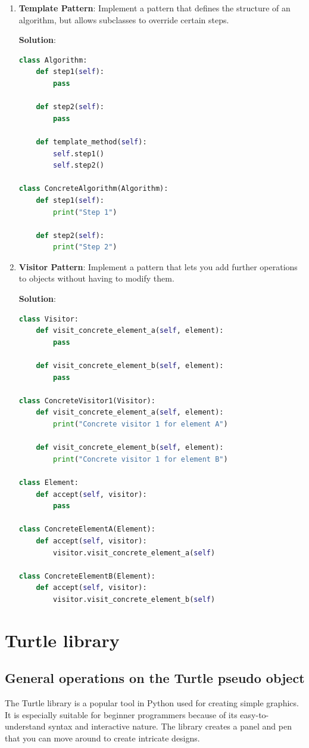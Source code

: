 \documentclass[12pt]{book}
\begin{document}
\begin{enumerate}
    \item \textbf{Template Pattern}: Implement a pattern that defines the structure of an algorithm, but allows subclasses to override certain steps.

    \textbf{Solution}:
    \begin{lstlisting}[language=Python]
class Algorithm:
    def step1(self):
        pass

    def step2(self):
        pass

    def template_method(self):
        self.step1()
        self.step2()

class ConcreteAlgorithm(Algorithm):
    def step1(self):
        print("Step 1")

    def step2(self):
        print("Step 2")
    \end{lstlisting}

    \item \textbf{Visitor Pattern}: Implement a pattern that lets you add further operations to objects without having to modify them.

    \textbf{Solution}:
    \begin{lstlisting}[language=Python]
class Visitor:
    def visit_concrete_element_a(self, element):
        pass

    def visit_concrete_element_b(self, element):
        pass

class ConcreteVisitor1(Visitor):
    def visit_concrete_element_a(self, element):
        print("Concrete visitor 1 for element A")

    def visit_concrete_element_b(self, element):
        print("Concrete visitor 1 for element B")

class Element:
    def accept(self, visitor):
        pass

class ConcreteElementA(Element):
    def accept(self, visitor):
        visitor.visit_concrete_element_a(self)

class ConcreteElementB(Element):
    def accept(self, visitor):
        visitor.visit_concrete_element_b(self)
    \end{lstlisting}
\end{enumerate}


\newpage
\newpage
\chapter{Turtle library}
\section{General operations on the Turtle pseudo object}
The Turtle library is a popular tool in Python used for creating simple graphics. It is especially suitable for beginner programmers because of its easy-to-understand syntax and interactive nature. The library creates a panel and pen that you can move around to create intricate designs.
\end{document}
